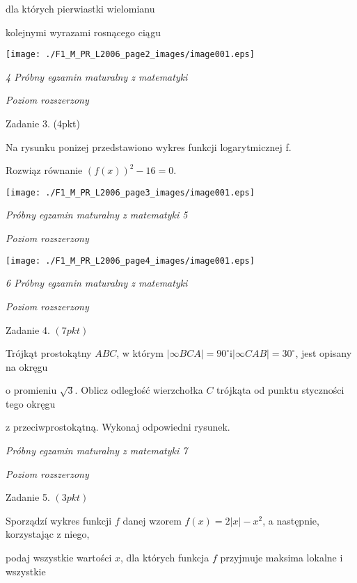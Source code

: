 \documentclass[a4paper,12pt]{article}
\begin{document}
dla których pierwiastki wielomianu

kolejnymi wyrazami rosnącego ciągu
\begin{center}
\texttt{[image: ./F1\_M\_PR\_L2006\_page2\_images/image001.eps]}
\end{center}




{\it 4 Próbny egzamin maturalny z matematyki}

{\it Poziom rozszerzony}

Zadanie 3. (4pkt)

Na rysunku ponizej przedstawiono wykres funkcji logarytmicznej f.

Rozwiąz równanie $(f(x))^{2}-16=0.$
\begin{center}
\texttt{[image: ./F1\_M\_PR\_L2006\_page3\_images/image001.eps]}
\end{center}




{\it Próbny egzamin maturalny z matematyki 5}

{\it Poziom rozszerzony}
\begin{center}
\texttt{[image: ./F1\_M\_PR\_L2006\_page4\_images/image001.eps]}
\end{center}




{\it 6 Próbny egzamin maturalny z matematyki}

{\it Poziom rozszerzony}

Zadanie 4. $(7pkt)$

Trójkąt prostokątny $ABC$, w którym $|\infty BCA|=90^{\circ} \mathrm{i} |\infty CAB|=30^{\circ}$, jest opisany na okręgu

o promieniu $\sqrt{3}$. Oblicz odległość wierzchołka $C$ trójkąta od punktu styczności tego okręgu

z przeciwprostokątną. Wykonaj odpowiedni rysunek.





{\it Próbny egzamin maturalny z matematyki 7}

{\it Poziom rozszerzony}

Zadanie 5. $(3pkt)$

Sporządzí wykres funkcji $f$ danej wzorem $f(x)=2|x|-x^{2}$, a następnie, korzystając z niego,

podaj wszystkie wartości $x$, dla których funkcja $f$ przyjmuje maksima lokalne i wszystkie
\end{document}
